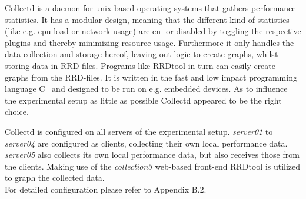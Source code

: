 Collectd is a daemon for unix-based operating systems that gathers performance statistics. It has a modular design, meaning that the different kind of statistics (like e.g. cpu-load or network-usage) are en- or disabled by toggling the respective plugins and thereby minimizing resource usage. Furthermore it only handles the data collection and storage hereof, leaving out logic to create graphs, whilst storing data in \ac{RRD} files. Programs like RRDtool in turn can easily create graphs from the RRD-files. It is written in the fast and low impact programming language C~\cite{prechelt2000empirical} and designed to be run on e.g. embedded devices.
As to influence the experimental setup as little as possible Collectd appeared to be the right choice.

Collectd is configured on all servers of the experimental setup. \emph{server01} to \emph{server04} are configured as clients, collecting their own local performance data. \emph{server05} also collects its own local performance data, but also receives those from the clients. Making use of the \emph{collection3} web-based front-end RRDtool is utilized to graph the collected data.
\\
For detailed configuration please refer to Appendix B.2.
